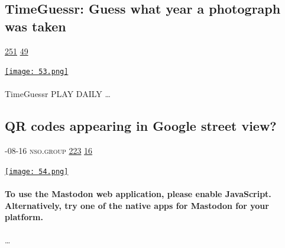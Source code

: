 \documentclass[10pt,a4paper]{article}
\begin{document}
\begin{multicols}{2}
\begin{minipage}{\linewidth}
\subsection{TimeGuessr: Guess what year a photograph was taken}
\textsc{\footnotesize
{\scriptsize\faThumbsOUp}\space 
\href{http://news.ycombinator.com/item?id=37203511\&utm\_term=comment}{251} 
{\scriptsize\faComments}\space 
\href{http://news.ycombinator.com/item?id=37203511\&utm\_term=comment}{49} 
}
\par\medskip\noindent
\href{https://timeguessr.com/?utm\_source=hackernewsletter\&utm\_medium=email\&utm\_term=fun}{
    \texttt{[image: 53.png]}
}
\end{minipage}
\paragraph{}
TimeGuessr PLAY DAILY
\dots\par
\noindent\begin{minipage}{\linewidth}
\medskip
\subsection{QR codes appearing in Google street view?}
\textsc{\footnotesize
{\scriptsize\faCalendar}-08-16 
{\scriptsize\faGlobe}\space 
nso.group 
{\scriptsize\faThumbsOUp}\space 
\href{http://news.ycombinator.com/item?id=37155574\&utm\_term=comment}{223} 
{\scriptsize\faComments}\space 
\href{http://news.ycombinator.com/item?id=37155574\&utm\_term=comment}{16} 
}
\par\medskip\noindent
\href{https://nso.group/@haifisch/110901720830132689\#.?utm\_source=hackernewsletter\&utm\_medium=email\&utm\_term=fun}{
    \texttt{[image: 54.png]}
}
\end{minipage}
\paragraph{}
\textbf{To use the Mastodon web application, please enable JavaScript. Alternatively, try one of the
native apps
for Mastodon for your platform.}
\paragraph{}

\dots\par
\end{multicols}

\newpage
\end{document}

